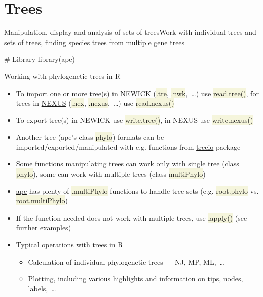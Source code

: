 \documentclass[compress, xelatex, 11pt, xcolor=svgnames, aspectratio=169, url={hyphens, lowtilde}]{beamer}
\renewcommand{\texttt}[1]{\colorbox{Beige}{{\ttfamily #1}}}
\begin{document}
\section{Trees}

\begin{frame}[fragile]{Manipulation, display and analysis of sets of trees}{Work with individual trees and sets of trees, finding species trees from multiple gene trees}
	\tableofcontents[currentsection, sectionstyle=show/hide, hideothersubsections]
	\begin{spluscode}
    # Library
    library(ape)
	\end{spluscode}
\end{frame}

\begin{frame}[allowframebreaks]{Working with phylogenetic trees in R}
	\begin{itemize}
		\item To import one or more tree(s) in \href{https://en.wikipedia.org/wiki/Newick_format}{NEWICK} (\texttt{*.tre}, \texttt{*.nwk},~\ldots) use \texttt{read.tree()}, for trees in \href{https://en.wikipedia.org/wiki/Nexus_file}{NEXUS} (\texttt{*.nex}, \texttt{*.nexus},~\ldots) use \texttt{read.nexus()}
		\item To export tree(s) in NEWICK use \texttt{write.tree()}, in NEXUS use \texttt{write.nexus()}
		\item Another tree (ape's class \texttt{phylo}) formats can be imported/exported/manipulated with e.g. functions from \href{https://bioconductor.org/packages/release/bioc/html/treeio.html}{treeio} package
		\item Some functions manipulating trees can work only with single tree (class \texttt{phylo}), some can work with multiple trees (class \texttt{multiPhylo})
		\item \href{https://CRAN.R-project.org/package=ape}{ape} has plenty of \texttt{*.multiPhylo} functions to handle tree sets (e.g. \texttt{root.phylo} vs. \texttt{root.multiPhylo})
		\item If the function needed does not work with multiple trees, use \texttt{lapply()} (see further examples)
		\item Typical operations with trees in R
		\begin{itemize}
			\item Calculation of individual phylogenetic trees --- NJ, MP, ML,~\ldots
			\item Plotting, including various highlights and information on tips, nodes, labels,~\ldots

\end{itemize}
\end{itemize}
\end{frame}
\end{document}
